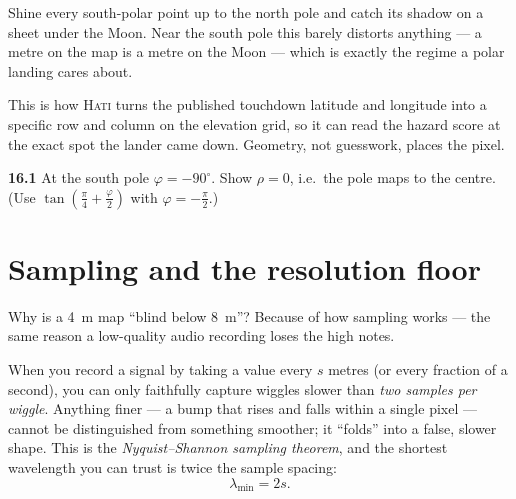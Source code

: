 \documentclass[11pt,oneside]{book}
\begin{document}
\begin{intuition}
Shine every south-polar point up to the north pole and catch its shadow on a sheet
under the Moon. Near the south pole this barely distorts anything --- a metre on the
map is a metre on the Moon --- which is exactly the regime a polar landing cares about.
\end{intuition}

\begin{hatibox}
This is how \textsc{Hati} turns the published touchdown latitude and longitude into a
specific row and column on the elevation grid, so it can read the hazard score at the
exact spot the lander came down. Geometry, not guesswork, places the pixel.
\end{hatibox}

\begin{practice}
\textbf{16.1} At the south pole $\varphi=-90^\circ$. Show $\rho=0$, i.e.\ the pole maps
to the centre. (Use $\tan(\tfrac{\pi}{4}+\tfrac{\varphi}{2})$ with $\varphi=-\tfrac{\pi}{2}$.)
\end{practice}

\chapter{Sampling and the resolution floor}

Why is a \SI{4}{m} map ``blind below \SI{8}{m}''? Because of how sampling works --- the
same reason a low-quality audio recording loses the high notes.

When you record a signal by taking a value every $s$ metres (or every fraction of a
second), you can only faithfully capture wiggles slower than \emph{two samples per
wiggle}. Anything finer --- a bump that rises and falls within a single pixel --- cannot
be distinguished from something smoother; it ``folds'' into a false, slower shape. This
is the \emph{Nyquist--Shannon sampling theorem}, and the shortest wavelength you can
trust is twice the sample spacing:
\begin{equation}
\lambda_{\min}=2s.
\end{equation}

\begin{center}
\end{center}
\end{document}
